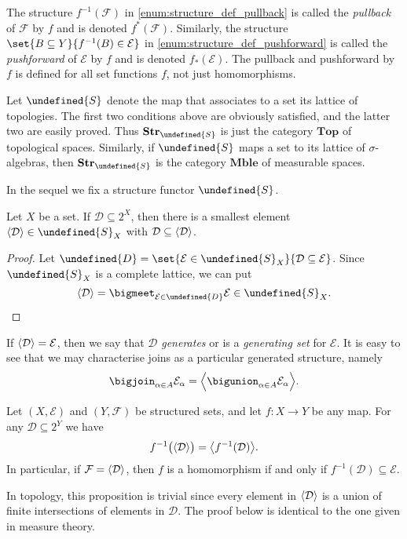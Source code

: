 \documentclass[article, a4paper, 11pt, oneside]{memoir}
\let\mathfrak\undefined
\numberwithin{equation}{chapter}
\newcommand{\calE}{\mathcal{E}}
\newcommand{\calD}{\mathcal{D}}
\newcommand{\calF}{\mathcal{F}}
\newcommand{\strucS}{\mathfrak{S}}
\DeclarePairedDelimiter{\gen}{\langle}{\rangle} %
\newcommand{\powerset}[1]{2^{#1}}
\newcommand{\ncat}[1]{\mathbf{#1}} %
\newcommand{\catTop}{\ncat{Top}} %
\newcommand{\catMble}{\ncat{Mble}} %
\newcommand{\catStruc}[1]{\ncat{Str}_{#1}} %
\newcommand{\catStrucS}{\catStruc{\strucS}} %
\newcommand{\preim}{^{-1}}
\begin{document}
The structure $f\preim(\calF)$ in \cref{enum:structure_def_pullback} is called the \emph{pullback} of $\calF$ by $f$ and is denoted $f^*(\calF)$. Similarly, the structure $\set{B \subseteq Y}{f\preim(B) \in \calE}$ in \cref{enum:structure_def_pushforward} is called the \emph{pushforward} of $\calE$ by $f$ and is denoted $f_*(\calE)$. The pullback and pushforward by $f$ is defined for all set functions $f$, not just homomorphisms.

\begin{example}
    Let $\strucS$ denote the map that associates to a set its lattice of topologies. The first two conditions above are obviously satisfied, and the latter two are easily proved. Thus $\catStrucS$ is just the category $\catTop$ of topological spaces. Similarly, if $\strucS$ maps a set to its lattice of $\sigma$-algebras, then $\catStrucS$ is the category $\catMble$ of measurable spaces.
\end{example}

In the sequel we fix a structure functor $\strucS$.

\begin{lemma}
    Let $X$ be a set. If $\calD \subseteq \powerset{X}$, then there is a smallest element $\gen{\calD} \in \strucS_X$ with $\calD \subseteq \gen{\calD}$.
\end{lemma}

\begin{proof}
    Let $\mathfrak{D} = \set{\calE \in \strucS_X}{\calD \subseteq \calE}$. Since $\strucS_X$ is a complete lattice, we can put
    \begin{equation*}
        \gen{\calD} = \bigmeet_{\calE \in \mathfrak{D}} \calE \in \strucS_X.
    \end{equation*}
\end{proof}
%
If $\gen{\calD} = \calE$, then we say that $\calD$ \emph{generates} or is a \emph{generating set} for $\calE$. It is easy to see that we may characterise joins as a particular generated structure, namely
%
\begin{equation}
    \label{eq:join_as_generated_structure}
    \bigjoin_{\alpha \in A} \calE_\alpha
        = \gen[\Big]{ \bigunion_{\alpha \in A} \calE_\alpha }.
\end{equation}

\begin{proposition}
    \label{thm:preimage_and_generation_commute}
    Let $(X,\calE)$ and $(Y,\calF)$ be structured sets, and let $f \colon X \to Y$ be any map. For any $\calD \subseteq 2^Y$ we have
    \begin{equation*}
        f\preim\bigl( \gen{\calD} \bigr) = \gen[\big]{f\preim(\calD)}.
    \end{equation*}
    In particular, if $\calF = \gen{\calD}$, then $f$ is a homomorphism if and only if $f\preim(\calD) \subseteq \calE$.
\end{proposition}
%
In topology, this proposition is trivial since every element in $\gen{\calD}$ is a union of finite intersections of elements in $\calD$. The proof below is identical to the one given in measure theory.
\end{document}
